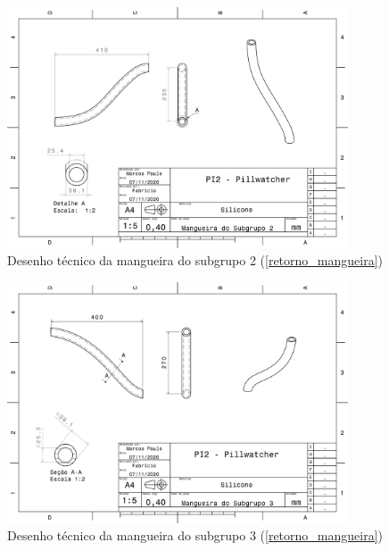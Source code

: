\begin{apendicesenv}
\begin{figure}[H]
    \centering
    \includegraphics[width=0.9\textwidth]{figuras/estrutura/Desenhos/S1C2.pdf}
    \caption{Desenho técnico da mangueira do subgrupo 2 (\ref{retorno_mangueira})}
    \label{fig:M_S2}
\end{figure}

\begin{figure}[H]
    \centering
    \includegraphics[width=0.9\textwidth]{figuras/estrutura/Desenhos/S1C3.pdf}
    \caption{Desenho técnico da mangueira do subgrupo 3 (\ref{retorno_mangueira})}
    \label{fig:M_S3}
\end{figure}


\end{apendicesenv}
